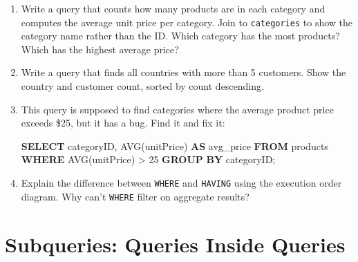 \documentclass[
  letterpaper,
  DIV=11,
  numbers=noendperiod]{scrreprt}
\newenvironment{Shaded}{\begin{snugshade}}{\end{snugshade}}
\newcommand{\DecValTok}[1]{\textcolor[rgb]{0.68,0.00,0.00}{#1}}
\newcommand{\FunctionTok}[1]{\textcolor[rgb]{0.28,0.35,0.67}{#1}}
\newcommand{\KeywordTok}[1]{\textcolor[rgb]{0.00,0.23,0.31}{\textbf{#1}}}
\newcommand{\NormalTok}[1]{\textcolor[rgb]{0.00,0.23,0.31}{#1}}
\newcommand{\OperatorTok}[1]{\textcolor[rgb]{0.37,0.37,0.37}{#1}}
\begin{document}
\begin{tcolorbox}[enhanced jigsaw, opacitybacktitle=0.6, arc=.35mm, colback=white, bottomtitle=1mm, opacityback=0, toprule=.15mm, left=2mm, colbacktitle=quarto-callout-note-color!10!white, breakable, coltitle=black, toptitle=1mm, colframe=quarto-callout-note-color-frame, bottomrule=.15mm, titlerule=0mm, title=\textcolor{quarto-callout-note-color}{\faInfo}\hspace{0.5em}{Exercises}, rightrule=.15mm, leftrule=.75mm]

\begin{enumerate}
\def\labelenumi{\arabic{enumi}.}
\item
  Write a query that counts how many products are in each category and
  computes the average unit price per category. Join to
  \texttt{categories} to show the category name rather than the ID.
  Which category has the most products? Which has the highest average
  price?
\item
  Write a query that finds all countries with more than 5 customers.
  Show the country and customer count, sorted by count descending.
\item
  This query is supposed to find categories where the average product
  price exceeds \$25, but it has a bug. Find it and fix it:

  \begin{codelisting}

  \caption{\texttt{duckdb}}

\begin{Shaded}
\begin{Highlighting}[]
\KeywordTok{SELECT}
\NormalTok{    categoryID,}
    \FunctionTok{AVG}\NormalTok{(unitPrice) }\KeywordTok{AS}\NormalTok{ avg\_price}
\KeywordTok{FROM}\NormalTok{ products}
\KeywordTok{WHERE} \FunctionTok{AVG}\NormalTok{(unitPrice) }\OperatorTok{\textgreater{}} \DecValTok{25}
\KeywordTok{GROUP} \KeywordTok{BY}\NormalTok{ categoryID;}
\end{Highlighting}
\end{Shaded}

  \end{codelisting}
\item
  Explain the difference between \texttt{WHERE} and \texttt{HAVING}
  using the execution order diagram. Why can't \texttt{WHERE} filter on
  aggregate results?
\end{enumerate}

\end{tcolorbox}

\section{Subqueries: Queries Inside
Queries}\label{subqueries-queries-inside-queries}
\end{document}
